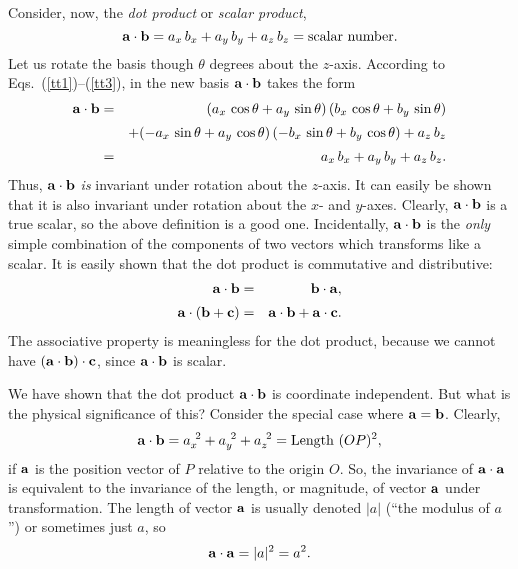 Consider, now, 
the {\em dot product} or {\em scalar product},
\begin{equation}
{\bf a} \cdot {\bf b} = a_x \,b_x + a_y \,b_y + a_z \,b_z =  {\rm scalar~number}.
\end{equation}
Let us rotate the basis though $\theta$ degrees about the $z$-axis. According to
Eqs.~(\ref{tt1})--(\ref{tt3}), in the new basis ${\bf a} \cdot {\bf b}$ takes the form
\begin{eqnarray}
 {\bf a} \cdot {\bf b} &= &(a_x\, \cos\theta+a_y\,\sin\theta)\,(b_x\,\cos\theta + b_y\,\sin\theta)\nonumber\\[0.5ex]
&&+(-a_x\,\sin\theta + a_y\,\cos\theta)\,(-b_x\,\sin \theta + b_y\,\cos\theta)
+a_z\, b_z\nonumber\\[0.5ex]
&= &a_x\, b_x + a_y\, b_y + a_z\, b_z.
\end{eqnarray}
Thus, 
${\bf a} \cdot {\bf b}$ {\em is} invariant under rotation about the $z$-axis. It can easily
be shown that it is also invariant under rotation about the $x$- and $y$-axes.
Clearly, ${\bf a} \cdot {\bf b}$ is a true scalar, so the above definition is
a good one. Incidentally, ${\bf a} \cdot {\bf b}$ is the {\em only}
simple  combination of
the components of two vectors which transforms like a scalar. It is easily
shown that the dot product  is commutative  and distributive:
\begin{eqnarray}
{\bf a} \cdot {\bf b} &=& {\bf b} \cdot {\bf a},\nonumber\\[0.5ex] 
{\bf a}\cdot({\bf b}+{\bf c}) &=& {\bf a} \cdot {\bf b} + {\bf a}\cdot {\bf c}.
\end{eqnarray}
The associative property is meaningless for the dot product, because we cannot
have $({\bf a}\cdot{\bf b}) \cdot{\bf c}$, since  ${\bf a}\cdot{\bf b}$ is scalar.

We have shown that the dot product ${\bf a} \cdot {\bf b}$ is coordinate independent.
But what is the physical significance of this? Consider the special case
where ${\bf a} = {\bf b}$. Clearly,
\begin{equation}
{\bf a} \cdot {\bf b} = a_x^{~2}+a_y^{~2} + a_z^{~2} = {\rm Length}~(OP)^2,
\end{equation}
if ${\bf a}$ is the position vector of $P$ relative to the origin $O$. 
So, the invariance of ${\bf a} \cdot {\bf a}$ is equivalent to the invariance 
of the length, or magnitude, of  vector ${\bf a}$ under transformation. The length of
 vector ${\bf a}$ is usually denoted $|a|$ (``the  modulus of $a$'') or sometimes
just $a$, so
\begin{equation}
{\bf a} \cdot {\bf a} = |a|^2  = a^2.
\end{equation}

